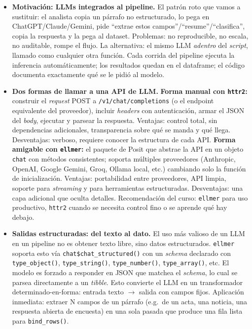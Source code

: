 \documentclass[11pt,letterpaper]{article}
\newcommand{\blue}[1]{{\color{cerulean}#1}}
\begin{document}
\begin{itemize}[leftmargin=*, itemsep=2pt]
    \item \textbf{Motivación: LLMs integrados al pipeline.} El patrón roto que vamos a sustituir: el analista copia un párrafo no estructurado, lo pega en ChatGPT/Claude/Gemini, pide ``extrae estos campos''/``resume''/``clasifica'', copia la respuesta y la pega al dataset. Problemas: no reproducible, no escala, no auditable, rompe el flujo. La alternativa: el mismo LLM \textit{adentro} del \textit{script}, llamado como cualquier otra función. Cada corrida del pipeline ejecuta la inferencia automáticamente; los resultados quedan en el dataframe; el código documenta exactamente qué se le pidió al modelo.
    \item \textbf{Dos formas de llamar a una API de LLM.} \textbf{Forma manual con \texttt{httr2}:} construir el \textit{request} POST a \texttt{/v1/chat/completions} (o el endpoint equivalente del proveedor), incluir \textit{headers} con autenticación, armar el JSON del \textit{body}, ejecutar y parsear la respuesta. Ventajas: control total, sin dependencias adicionales, transparencia sobre qué se manda y qué llega. Desventajas: verboso, requiere conocer la estructura de cada API. \textbf{Forma amigable con \texttt{ellmer}:} el paquete de Posit que abstrae la API en un objeto \texttt{chat} con métodos consistentes; soporta múltiples proveedores (Anthropic, OpenAI, Google Gemini, Groq, Ollama local, etc.) cambiando solo la función de inicialización. Ventajas: portabilidad entre proveedores, API limpia, soporte para \textit{streaming} y para herramientas estructuradas. Desventajas: una capa adicional que oculta detalles. \blue{Recomendación del curso:} \texttt{ellmer} para uso productivo, \texttt{httr2} cuando se necesita control fino o se aprende qué hay debajo.
    \item \textbf{Salidas estructuradas: del texto al dato.} El uso más valioso de un LLM en un pipeline no es obtener texto libre, sino \blue{datos estructurados}. \texttt{ellmer} soporta esto vía \texttt{chat\$chat\_structured()} con un \textit{schema} declarado con \texttt{type\_object()}, \texttt{type\_string()}, \texttt{type\_number()}, \texttt{type\_array()}, etc. El modelo es forzado a responder en JSON que matchea el \textit{schema}, lo cual se parsea directamente a un \textit{tibble}. Esto convierte el LLM en un transformador determinado-en-forma: entrada texto $\to$ salida con campos fijos. Aplicación inmediata: extraer N campos de un párrafo (e.g.\ de un acta, una noticia, una respuesta abierta de encuesta) en una sola pasada que produce una fila lista para \texttt{bind\_rows()}.

\end{itemize}
\end{document}
